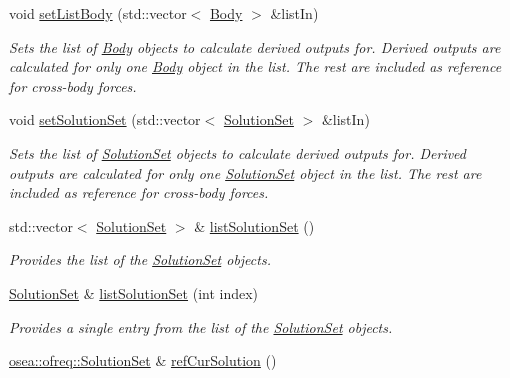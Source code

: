 \begin{DoxyCompactItemize}
void \hyperlink{classosea_1_1ofreq_1_1_outputs_body_affe1a6cc1e310a6b84edec3804340354}{set\-List\-Body} (std\-::vector$<$ \hyperlink{classosea_1_1ofreq_1_1_body}{Body} $>$ \&list\-In)
\begin{DoxyCompactList}\small\item\em Sets the list of \hyperlink{classosea_1_1ofreq_1_1_body}{Body} objects to calculate derived outputs for. Derived outputs are calculated for only one \hyperlink{classosea_1_1ofreq_1_1_body}{Body} object in the list. The rest are included as reference for cross-\/body forces. \end{DoxyCompactList}\item 
void \hyperlink{classosea_1_1ofreq_1_1_outputs_body_a9d77d0704823b360ce4f6e8203203d51}{set\-Solution\-Set} (std\-::vector$<$ \hyperlink{classosea_1_1ofreq_1_1_solution_set}{Solution\-Set} $>$ \&list\-In)
\begin{DoxyCompactList}\small\item\em Sets the list of \hyperlink{classosea_1_1ofreq_1_1_solution_set}{Solution\-Set} objects to calculate derived outputs for. Derived outputs are calculated for only one \hyperlink{classosea_1_1ofreq_1_1_solution_set}{Solution\-Set} object in the list. The rest are included as reference for cross-\/body forces. \end{DoxyCompactList}\item 
std\-::vector$<$ \hyperlink{classosea_1_1ofreq_1_1_solution_set}{Solution\-Set} $>$ \& \hyperlink{classosea_1_1ofreq_1_1_outputs_body_af05d17b2ae5f861198bd56fafa8da3d1}{list\-Solution\-Set} ()
\begin{DoxyCompactList}\small\item\em Provides the list of the \hyperlink{classosea_1_1ofreq_1_1_solution_set}{Solution\-Set} objects. \end{DoxyCompactList}\item 
\hyperlink{classosea_1_1ofreq_1_1_solution_set}{Solution\-Set} \& \hyperlink{classosea_1_1ofreq_1_1_outputs_body_ae3e9d0060457376bb42661db79392d4b}{list\-Solution\-Set} (int index)
\begin{DoxyCompactList}\small\item\em Provides a single entry from the list of the \hyperlink{classosea_1_1ofreq_1_1_solution_set}{Solution\-Set} objects. \end{DoxyCompactList}\item 
\hyperlink{classosea_1_1ofreq_1_1_solution_set}{osea\-::ofreq\-::\-Solution\-Set} \& \hyperlink{classosea_1_1ofreq_1_1_outputs_body_abc2caacb89c3574f31286f5a0e967671}{ref\-Cur\-Solution} ()

\end{DoxyCompactItemize}
